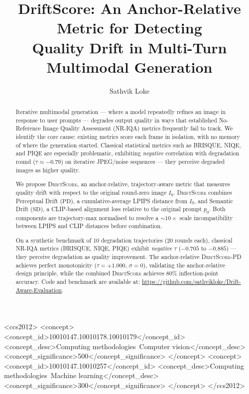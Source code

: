 \documentclass[sigconf]{acmart}
\newcommand{\DS}{\textsc{DriftScore}}
\newcommand{\PD}{\ensuremath{\mathrm{PD}}}
\newcommand{\SD}{\ensuremath{\mathrm{SD}}}
\newcommand{\Izero}{\ensuremath{I_0}}
\newcommand{\pzero}{\ensuremath{p_0}}
\begin{document}
\title{DriftScore: An Anchor-Relative Metric for Detecting\\
Quality Drift in Multi-Turn Multimodal Generation}

\author{Sathvik Loke}

\begin{abstract}
Iterative multimodal generation --- where a model repeatedly refines an
image in response to user prompts --- degrades output quality in ways that
established No-Reference Image Quality Assessment (NR-IQA) metrics
frequently fail to track.
We identify the core cause: existing metrics score each frame in
isolation, with no memory of where the generation started.
Classical statistical metrics such as BRISQUE, NIQE, and PIQE are
especially problematic, exhibiting \emph{negative} correlation with
degradation round ($\tau \approx -0.79$) on iterative JPEG/noise
sequences --- they perceive degraded images as higher quality.

We propose \DS{}, an anchor-relative, trajectory-aware metric that
measures quality drift with respect to the original round-zero image
$\Izero$.
\DS{} combines Perceptual Drift (\PD), a cumulative-average LPIPS
distance from $\Izero$, and Semantic Drift (\SD), a CLIP-based alignment
loss relative to the original prompt $\pzero$.
Both components are trajectory-max normalised to resolve a ${\sim}10\times$
scale incompatibility between LPIPS and CLIP distances before combination.

On a synthetic benchmark of 10 degradation trajectories (20 rounds each),
classical NR-IQA metrics (BRISQUE, NIQE, PIQE) exhibit \emph{negative}
$\tau$ ($-0.705$ to $-0.885$) --- they perceive degradation as quality
improvement.
The anchor-relative \DS{}-PD achieves perfect monotonicity
($\tau = +1.000$, $\sigma = 0$), validating the anchor-relative
design principle, while the combined \DS{} achieves 80\% inflection-point
accuracy.
Code and benchmark are available at:
\url{https://github.com/sathvikloke/Drift-Aware-Evaluation}.
\end{abstract}

\begin{CCSXML}
<ccs2012>
  <concept>
    <concept_id>10010147.10010178.10010179</concept_id>
    <concept_desc>Computing methodologies~Computer vision</concept_desc>
    <concept_significance>500</concept_significance>
  </concept>
  <concept>
    <concept_id>10010147.10010257</concept_id>
    <concept_desc>Computing methodologies~Machine learning</concept_desc>
    <concept_significance>300</concept_significance>
  </concept>
</ccs2012>
\end{CCSXML}
\end{document}
